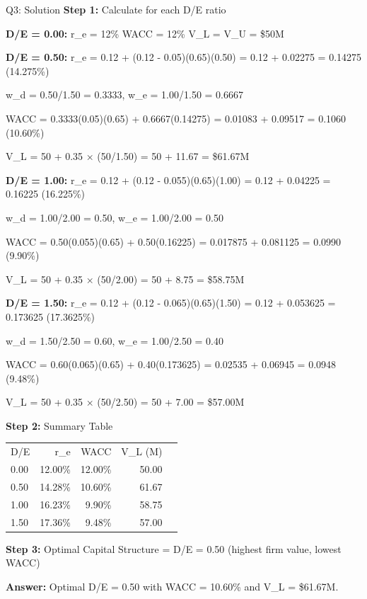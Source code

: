 \documentclass{beamer}
\renewcommand{\scriptsize}{\fontsize{6pt}{7pt}\selectfont}
\begin{document}
	\begin{frame}{Q3: Solution}
		\scriptsize
		\textbf{Step 1:} Calculate for each D/E ratio
		
		\textbf{D/E = 0.00:}
		r\_e = 12\%
		WACC = 12\%
		V\_L = V\_U = \$50M
		
		\textbf{D/E = 0.50:}
		r\_e = 0.12 + (0.12 - 0.05)(0.65)(0.50) = 0.12 + 0.02275 = 0.14275 (14.275\%)
		
		w\_d = 0.50/1.50 = 0.3333, w\_e = 1.00/1.50 = 0.6667
		
		WACC = 0.3333(0.05)(0.65) + 0.6667(0.14275) = 0.01083 + 0.09517 = 0.1060 (10.60\%)
		
		V\_L = 50 + 0.35 × (50/1.50) = 50 + 11.67 = \$61.67M
		
		\textbf{D/E = 1.00:}
		r\_e = 0.12 + (0.12 - 0.055)(0.65)(1.00) = 0.12 + 0.04225 = 0.16225 (16.225\%)
		
		w\_d = 1.00/2.00 = 0.50, w\_e = 1.00/2.00 = 0.50
		
		WACC = 0.50(0.055)(0.65) + 0.50(0.16225) = 0.017875 + 0.081125 = 0.0990 (9.90\%)
		
		V\_L = 50 + 0.35 × (50/2.00) = 50 + 8.75 = \$58.75M
		
		\textbf{D/E = 1.50:}
		r\_e = 0.12 + (0.12 - 0.065)(0.65)(1.50) = 0.12 + 0.053625 = 0.173625 (17.3625\%)
		
		w\_d = 1.50/2.50 = 0.60, w\_e = 1.00/2.50 = 0.40
		
		WACC = 0.60(0.065)(0.65) + 0.40(0.173625) = 0.02535 + 0.06945 = 0.0948 (9.48\%)
		
		V\_L = 50 + 0.35 × (50/2.50) = 50 + 7.00 = \$57.00M
		
		\vspace{2pt}
		\textbf{Step 2:} Summary Table
		
		\begin{tabular}{lrrrr}
			D/E & r\_e & WACC & V\_L (M) \\
			0.00 & 12.00\% & 12.00\% & 50.00 \\
			0.50 & 14.28\% & 10.60\% & 61.67 \\
			1.00 & 16.23\% & 9.90\% & 58.75 \\
			1.50 & 17.36\% & 9.48\% & 57.00 \\
		\end{tabular}
		
		\vspace{2pt}
		\textbf{Step 3:} Optimal Capital Structure = D/E = 0.50 (highest firm value, lowest WACC)
		
		\textbf{Answer:} Optimal D/E = 0.50 with WACC = 10.60\% and V\_L = \$61.67M.
	\end{frame}
	
\end{document}
